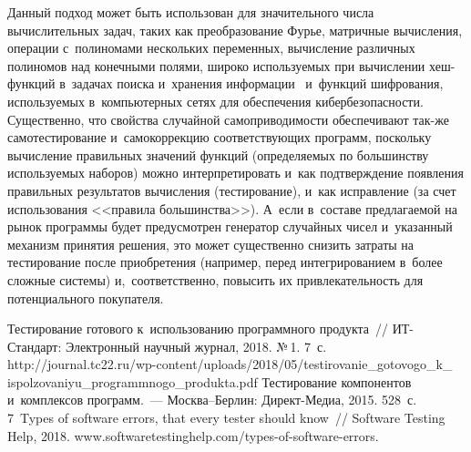 \begin{multicols}{2}
    Данный подход может быть использован для значительного числа 
вычислительных задач, таких\linebreak
 как преобразование Фурье, матричные 
вы\-чис\-ления, операции с~полиномами нескольких пе\-ре\-менных, вычисление 
различных полиномов над\linebreak
 конечными полями, широко используемых при 
вычислении хеш-функ\-ций в~задачах поиска и~хранения  
информации~\cite{15-bf} и~функций шифрования, используемых 
в~компьютерных сетях для обеспечения кибербезопасности. 
%
Существенно, 
что свойства случайной самоприводимости обеспечивают так-\linebreak же
самотестирование и~самокоррекцию со\-от\-вет\-ст\-ву\-ющих программ, поскольку 
вычисление правильных значений функций (определяемых по\linebreak
 большинству 
используемых наборов) можно интерпретировать и~как под\-тверж\-де\-ние 
появления правильных результатов вычисления (тестирование), и~как 
ис\-прав\-ле\-ние (за счет использования <<правила большинства>>). А~если 
в~со\-ста\-ве предлагаемой на рынок программы будет преду\-смот\-рен генератор 
случайных чисел и~указанный механизм принятия решения, это может 
существенно снизить за\-тра\-ты на тес\-ти\-ро\-ва\-ние после приобретения 
(например, перед интегрированием в~более слож\-ные сис\-те\-мы) 
и,~соответственно, повысить их привлекательность для потенциального 
покупателя.

\vspace*{-8pt}
    
  {\small\frenchspacing
 {%
 \begin{thebibliography}{99}
 
 \vspace*{-1pt}
 
      Тестирование 
готового к~использованию про\-грам\-много продукта~// ИТ-Стан\-дарт: Электронный 
научный журнал, 2018. №\,1. 7~с.
{\sf  
http://journal.tc22.ru/\linebreak wp-content/uploads/2018/05/testirovanie\_gotovogo\_k\_\linebreak 
ispolzovaniyu\_programmnogo\_produkta.pdf}
      Тестирование компонентов и~комплексов программ.~---  
Москва--Берлин: Директ-Медиа, 2015. 528~с.
     7~Types of software errors, that every tester should know~// Software Testing Help, 2018. 
{\sf www.softwaretestinghelp.\linebreak com/types-of-software-errors}.


\end{thebibliography}}}
\end{multicols}

